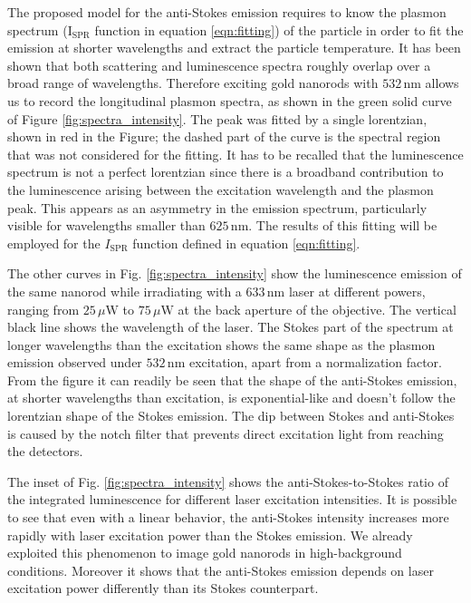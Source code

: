 \documentclass[journal=nalefd,manuscript=letter]{achemso}
\newcommand{\nm}{\ensuremath{\,\textrm{nm}}}
\newcommand{\uW}{\ensuremath{\,\mu\textrm{W}}}
\begin{document}
The proposed model for the anti-Stokes emission requires to know the plasmon
spectrum ($\textrm{I}_{\textrm{SPR}}$ function in equation \ref{eqn:fitting}) of
the particle in order to fit the emission at shorter wavelengths and extract the
particle temperature. It has been shown that both scattering and luminescence
spectra roughly overlap over a broad range of wavelengths\cite{Yorulmaz2012}. Therefore
exciting gold nanorods with $532\nm$ allows us to record the longitudinal
plasmon spectra, as shown in the green solid curve of Figure \ref{fig:spectra_intensity}. The
peak was fitted by a single lorentzian, shown in red in the Figure; the dashed
part of the curve is the spectral region that was not considered for the
fitting. It has to be recalled that the luminescence spectrum is not a perfect
lorentzian since there is a broadband contribution to the luminescence arising
between the excitation wavelength and the plasmon peak\cite{Boyd1986}. This
appears as an asymmetry in the emission spectrum, particularly visible for
wavelengths smaller than $625\nm$. The results of this fitting will be employed
for the $I_\textrm{SPR}$ function defined in equation \ref{eqn:fitting}. 

The other curves in Fig. \ref{fig:spectra_intensity} show the luminescence emission of
the same nanorod while irradiating with a $633\nm$ laser at different powers,
ranging from $25\uW$ to $75\uW$ at the back aperture of the objective. The
vertical black line shows the wavelength of the laser. The Stokes part of the
spectrum at longer wavelengths than the excitation shows the same shape as the
plasmon emission observed under $532\nm$ excitation, apart from a normalization
factor. From the figure it can readily be seen that the shape of the anti-Stokes
emission, at shorter wavelengths than excitation, is exponential-like and
doesn't follow the lorentzian shape of the Stokes emission. The dip between
Stokes and anti-Stokes is caused by the notch filter that prevents direct
excitation light from reaching the detectors.

The inset of Fig. \ref{fig:spectra_intensity} shows the anti-Stokes-to-Stokes ratio of
the integrated luminescence for different laser excitation intensities. It is
possible to see that even with a linear behavior, the anti-Stokes intensity
increases more rapidly with laser excitation power than the Stokes emission.
We already exploited this phenomenon to image gold nanorods in high-background
conditions\cite{Carattino2016a}. Moreover it shows that the anti-Stokes emission
depends on laser excitation power differently than its Stokes counterpart. 
\end{document}
